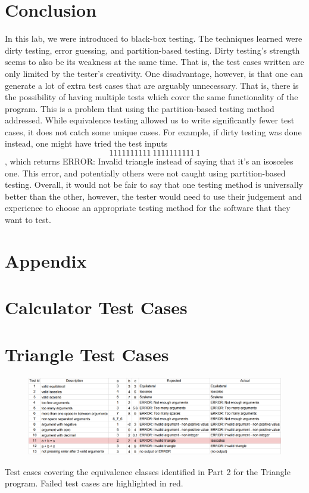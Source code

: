 \documentclass[letterpaper]{article}
\begin{document}
\section*{Conclusion}
In this lab, we were introduced to black-box testing. The techniques
learned were dirty testing, error guessing, and partition-based testing.
Dirty testing's strength seems to also be its weakness at the same time. That is,
the test cases written are only limited by the tester's creativity.
One disadvantage, however, is that one can generate a lot of extra test cases
that are arguably unnecessary. That is, there is the possibility of having multiple
tests which cover the same functionality of the program. This is a problem that
using the partition-based testing method addressed. While equivalence testing allowed us 
to write significantly fewer test cases,
it does not catch some unique cases. For example, if dirty testing was done instead,
one might have tried the test inputs $$1111111111\ 1111111111\ 1$$, which returns ERROR: Invalid triangle
instead of saying that it's an isosceles one. This error, and potentially others were not
caught using partition-based testing. Overall, it would not be fair to say that
one testing method is universally better than the other, however, the tester would
need to use their judgement and experience to choose an appropriate testing method
for the software that they want to test.

\appendix
\section*{Appendix}
\section{Calculator Test Cases} \label{calculatortestcases}


\section{Triangle Test Cases} \label{triangletestcases}
% 
\begin{table}[H]
    \begin{figure}[H]
        \centering
        \includegraphics[width=1.1\textwidth]{triangletable.png}
    \end{figure}
    \caption{Test cases covering the equivalence classes identified in Part 2 for the Triangle program. Failed test cases are highlighted in red.}
\end{table}
\end{document}
